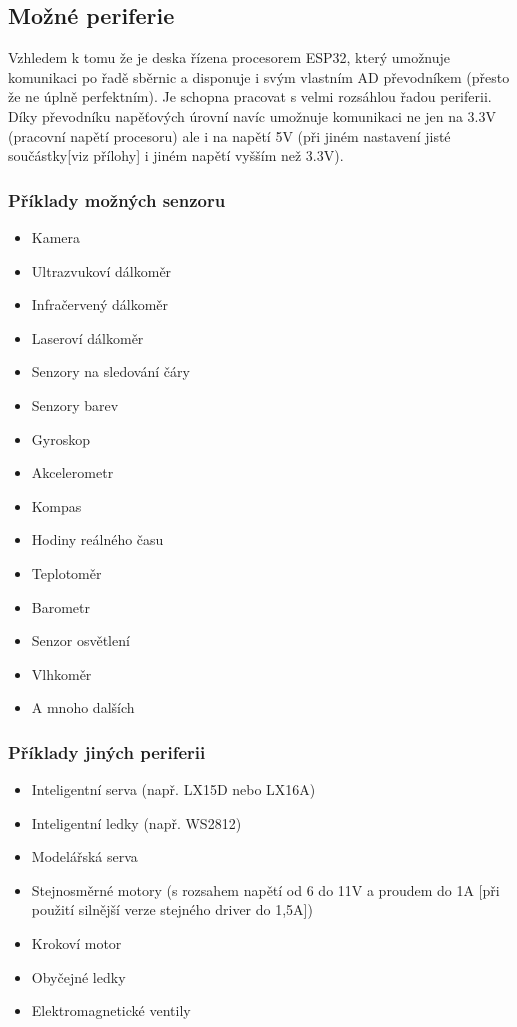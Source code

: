 \documentclass{template/socthesis}
\begin{document}
\subsection{Možné periferie}
Vzhledem k tomu že je deska řízena procesorem ESP32, který umožnuje komunikaci po řadě sběrnic a disponuje i svým vlastním AD převodníkem (přesto že ne úplně perfektním). Je schopna pracovat s velmi rozsáhlou řadou periferii. Díky převodníku napěťových úrovní navíc umožnuje komunikaci ne jen na 3.3V (pracovní napětí procesoru) ale i na napětí 5V (při jiném nastavení jisté součástky[viz přílohy] i jiném napětí vyšším než 3.3V). 
\subsubsection{Příklady možných senzoru}
\begin{itemize}
	\item Kamera
	\item Ultrazvukoví dálkoměr
	\item Infračervený dálkoměr
	\item Laseroví dálkoměr
	\item Senzory na sledování čáry
	\item Senzory barev
	\item Gyroskop
	\item Akcelerometr
	\item Kompas
	\item Hodiny reálného času
	\item Teplotoměr
	\item Barometr
	\item Senzor osvětlení
	\item Vlhkoměr
	\item A mnoho dalších
\end{itemize}

\subsubsection{Příklady jiných periferii}

\begin{itemize}
	\item Inteligentní serva (např. LX15D nebo LX16A)
	\item Inteligentní ledky (např. WS2812)
	\item Modelářská serva
	\item Stejnosměrné motory (s rozsahem napětí od 6 do 11V a proudem do 1A [při použití silnější verze stejného driver do 1,5A])
	\item Krokoví motor
	\item Obyčejné ledky
	\item Elektromagnetické ventily
\end{itemize}
\end{document}

